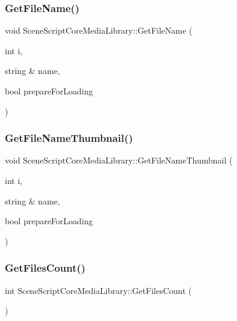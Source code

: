 \subsubsection{\texorpdfstring{Get\+File\+Name()}{GetFileName()}}
{\footnotesize\ttfamily void Scene\+Script\+Core\+Media\+Library\+::\+Get\+File\+Name (\begin{DoxyParamCaption}\item[{int}]{i,  }\item[{string \&}]{name,  }\item[{bool}]{prepare\+For\+Loading }\end{DoxyParamCaption})}

\hypertarget{class_scene_script_core_media_library_a047cee9cdba218c2e06da622441097f4}{}\label{class_scene_script_core_media_library_a047cee9cdba218c2e06da622441097f4} 
\subsubsection{\texorpdfstring{Get\+File\+Name\+Thumbnail()}{GetFileNameThumbnail()}}
{\footnotesize\ttfamily void Scene\+Script\+Core\+Media\+Library\+::\+Get\+File\+Name\+Thumbnail (\begin{DoxyParamCaption}\item[{int}]{i,  }\item[{string \&}]{name,  }\item[{bool}]{prepare\+For\+Loading }\end{DoxyParamCaption})}

\hypertarget{class_scene_script_core_media_library_ab8aca7994620b7bac0c292ffc6bdcec1}{}\label{class_scene_script_core_media_library_ab8aca7994620b7bac0c292ffc6bdcec1} 
\subsubsection{\texorpdfstring{Get\+Files\+Count()}{GetFilesCount()}}
{\footnotesize\ttfamily int Scene\+Script\+Core\+Media\+Library\+::\+Get\+Files\+Count (\begin{DoxyParamCaption}{ }\end{DoxyParamCaption})}

